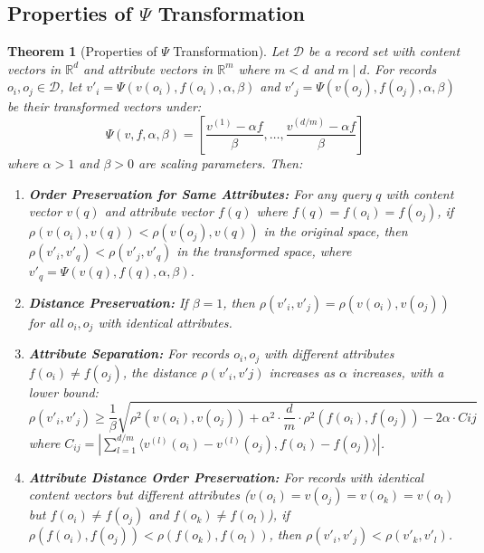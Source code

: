\documentclass[numbers,sort]{article}
\newtheorem{theorem}{Theorem}
\begin{document}
\subsection{Properties of $\Psi$ Transformation}
\begin{theorem}[Properties of $\Psi$ Transformation]
\label{theo:psi_property}
Let $\mathcal{D}$ be a record set with content vectors in $\mathbb{R}^d$ and attribute vectors in $\mathbb{R}^m$ where $m < d$ and $m \mid d$. For records $o_i, o_j \in \mathcal{D}$, let $v'_i = \Psi(v(o_i), f(o_i), \alpha, \beta)$ and $v'_j = \Psi(v(o_j), f(o_j), \alpha, \beta)$ be their transformed vectors under:
\begin{equation}
\Psi(v, f, \alpha, \beta) = \left[\frac{v^{(1)} - \alpha f}{\beta}, \ldots, \frac{v^{(d/m)} - \alpha f}{\beta}\right]
\end{equation}
where $\alpha > 1$ and $\beta > 0$ are scaling parameters. Then:

\begin{enumerate}[leftmargin=2em]
\item \textbf{Order Preservation for Same Attributes:} For any query $q$ with content vector $v(q)$ and attribute vector $f(q)$ where $f(q) = f(o_i) = f(o_j)$, if $\rho(v(o_i), v(q)) < \rho(v(o_j), v(q))$ in the original space, then $\rho(v'_i, v'_q) < \rho(v'_j, v'_q)$ in the transformed space, where $v'_q = \Psi(v(q), f(q), \alpha, \beta)$.

\item \textbf{Distance Preservation:} If $\beta = 1$, then $\rho(v'_i, v'_j) = \rho(v(o_i), v(o_j))$ for all $o_i, o_j$ with identical attributes.

\item \textbf{Attribute Separation:} For records $o_i, o_j$ with different attributes $f(o_i) \neq f(o_j)$, the distance $\rho(v'_i, v'j)$ increases as $\alpha$ increases, with a lower bound:
\begin{equation}
\rho(v'_i, v'_j) \geq \frac{1}{\beta}\sqrt{\rho^2(v(o_i), v(o_j)) + \alpha^2 \cdot \frac{d}{m} \cdot \rho^2(f(o_i), f(o_j)) - 2\alpha \cdot C{ij}}
\end{equation}
where $C_{ij} = |\sum_{l=1}^{d/m} \langle v^{(l)}(o_i) - v^{(l)}(o_j), f(o_i) - f(o_j) \rangle|$.

\item \textbf{Attribute Distance Order Preservation:} For records with identical content vectors but different attributes ($v(o_i) = v(o_j) = v(o_k) = v(o_l)$ but $f(o_i) \neq f(o_j)$ and $f(o_k) \neq f(o_l)$), if $\rho(f(o_i), f(o_j)) < \rho(f(o_k), f(o_l))$, then $\rho(v'_i, v'_j) < \rho(v'_k, v'_l)$.
\end{enumerate}
\end{theorem}
\end{document}
